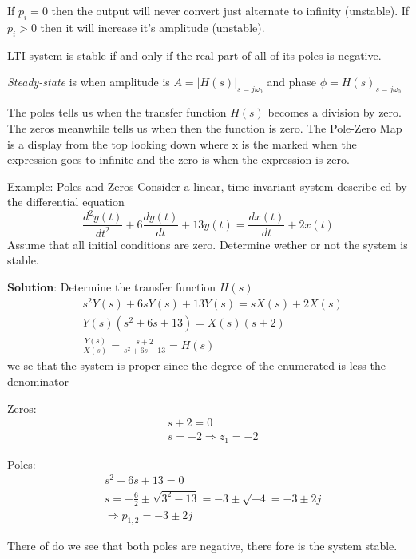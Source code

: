 If $p_i=0$ then the output will never convert just alternate to infinity (unstable). \newline
\indent If $p_i>0$ then it will increase it's amplitude (unstable). \newline

LTI system is stable if and only if the real part of all of its poles is negative. \newline

\textit{Steady-state} is when amplitude is $A=|H(s)|_{s=j\omega_0}$ and phase $\phi=H(s)_{s=j\omega_0}$ \newline

The poles tells us when the transfer function $H(s)$ becomes a division by zero. 
The zeros meanwhile tells us when then the function is zero. The Pole-Zero Map 
is a display from the top looking down where x is the marked when the expression goes to infinite and
the zero is when the expression is zero.

\begin{exampleblock}{Example: Poles and Zeros}%
Consider a linear, time-invariant system describe ed by the differential equation
\begin{equation*}
    \frac{d^2y(t)}{dt^2} + 6\frac{dy(t)}{dt} + 13y(t) = \frac{dx(t)}{dt} + 2x(t)
\end{equation*}
Assume that all initial conditions are zero.
Determine wether or not the system is stable.

\textbf{Solution}:
Determine the transfer function $H(s)$
\begin{align*}
    &s^2Y(s) +6sY(s) + 13Y(s) = sX(s) + 2X(s) \\
    &Y(s)(s^2+6s+13) = X(s)(s+2) \\
    &\frac{Y(s)}{X(s)} = \frac{s+2}{s^2+6s+13} = H(s)
\end{align*}
we se that the system is proper since the degree of the enumerated is less the denominator

Zeros:
\begin{align*}
    &s+2=0 \\
    &s=-2 \Rightarrow z_1=-2
\end{align*}

Poles:
\begin{align*}
    &s^2+6s+13 = 0 \\
    &s=-\frac{6}{2}\pm\sqrt{3^2-13}=-3\pm\sqrt{-4}=-3\pm 2j \\
    &\Rightarrow p_{1,2} = -3\pm 2j
\end{align*}

There of do we see that both poles are negative, there fore is the system stable.
\end{exampleblock}

